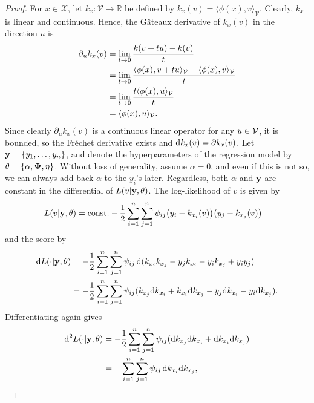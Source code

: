 \begin{proof}
	For $x \in \mathcal X$, let $k_x:\mathcal V \rightarrow \mathbb R$ be defined by $k_x(v) = \langle \phi(x), v \rangle_{\mathcal V}$. 
	Clearly, $k_x$ is linear and continuous.
	Hence, the Gâteaux derivative of $k_x(v)$ in the direction $u$ is
	\begin{align*}
		\partial_u k_x(v)	
		&= \lim_{t \rightarrow 0} \frac{k(v+t u) - k(v)}{t} \\
		&= \lim_{t \rightarrow 0} \frac{\langle \phi(x), v+t u \rangle_{{\mathcal V}} - \langle \phi(x), v \rangle_{{\mathcal V}}}{t} \\
		&= \lim_{t \rightarrow 0} \frac{t\langle \phi(x), u \rangle_{{\mathcal V}}}{t} \\
		&= \langle \phi(x), u \rangle_{{\mathcal V}}.
	\end{align*}
    Since clearly $\partial_u k_x(v)$ is a continuous linear operator for any $u\in{\mathcal V}$, it is bounded, so the Fréchet derivative exists and $\text{d} k_x(v) = \partial k_x(v)$.
	Let ${\mathbf y} = \{y_1,\dots,y_n\}$, and denote the hyperparameters of the regression model by $\theta = \{ \alpha,{\bm\Psi},\eta \}$.
	Without loss of generality, assume $\alpha = 0$, and even if this is not so, we can always add back $\alpha$ to the $y_i$'s later.
	Regardless, both $\alpha$ and ${\mathbf y}$ are constant in the differential of $L(v|{\mathbf y}, \theta)$.
	The log-likelihood of $v$ is given by
	\begin{align*}
		L(v|{\mathbf y},\theta) 
		&= \text{const.}\hspace{0.01em} - \frac{1}{2} \sum_{i=1}^n\sum_{j=1}^n \psi_{ij}\big(y_i - k_{x_i}(v)\big)\big(y_j  - k_{x_j}(v)\big)
	\end{align*}
	and the score by
	\begin{align*}
	  \text{d} L(\cdot|{\mathbf y},\theta)
	  &= - \frac{1}{2} \sum_{i=1}^n\sum_{j=1}^n \psi_{ij} \, \text{d} (k_{x_i}k_{x_j} - y_jk_{x_i} - y_ik_{x_j} + y_iy_j )  \\
	  &= - \frac{1}{2} \sum_{i=1}^n\sum_{j=1}^n \psi_{ij} (k_{x_j} \text{d} k_{x_i}  + k_{x_i}\text{d} k_{x_j} - y_j \text{d} k_{x_i} - y_i \text{d} k_{x_j} ).
	\end{align*}
	Differentiating again gives
	\begin{align*}
		\text{d}^2 L(\cdot|{\mathbf y},\theta)
		&= - \frac{1}{2} \sum_{i=1}^n\sum_{j=1}^n \psi_{ij} (\text{d} k_{x_j} \text{d} k_{x_i}  + \text{d} k_{x_i}\text{d} k_{x_j}) \\
		&= - \sum_{i=1}^n\sum_{j=1}^n \psi_{ij} \, \text{d} k_{x_i} \text{d} k_{x_j},
	\end{align*}

\end{proof}
